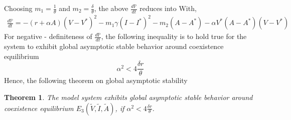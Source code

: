 \documentclass[12pt]{article}
\newtheorem{theorem}{Theorem}[section]
\numberwithin{equation}{section}
\begin{document}
Choosing $m_1 = \frac{1}{\theta}$ and $m_2 = \frac{\delta}{\theta}$, the above $\frac{d \mathbb P}{dt}$ reduces into
With,
\begin{equation}\label{sec3:e42}
\begin{split}
\frac{d\mathbb P}{dt} = -(r+\alpha A)(V-V^*)^2 - m_1\gamma(I-I^*)^2 - m_2(A-A^*)-\alpha V^*(A-A^*)(V-V^*)
\end{split}
\end{equation}
For negative - definiteness of $\frac{d \mathbb P}{dt}$, the following inequality is to hold true for the system to exhibit global asymptotic stable behavior around coexistence equilibrium
\begin{equation}
\alpha^2<4\frac{\delta r}{\theta}  
\end{equation}
Hence, the following theorem on global asymptotic stability
\begin{theorem}\label{Theorem 3.5}
The model system exhibits global asymptotic stable behavior around coexistence equilibrium $E_3(\tilde V,\tilde I,\tilde A)$, if $\alpha^2<4\frac{\delta r}{\theta}$.
\end{theorem}
\end{document}
